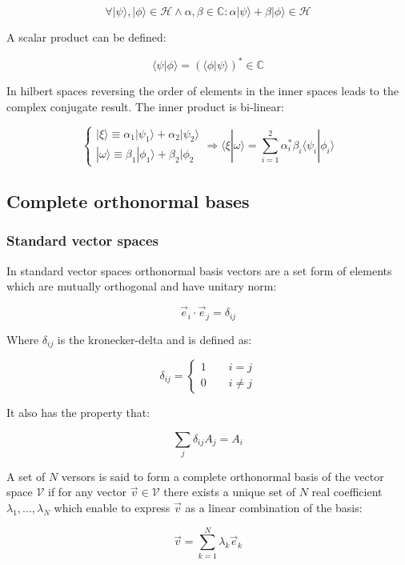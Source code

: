 		$$\forall |\psi\rangle,|\phi\rangle\in\mathcal{H}\land \alpha,\beta\in\mathbb{C}: \alpha|\psi\rangle + \beta|\phi\rangle\in\mathcal{H}$$

		A scalar product can be defined:

		$$\langle\psi|\phi\rangle = (\langle\phi|\psi\rangle)^*\in\mathbb{C}$$

		In hilbert spaces reversing the order of elements in the inner spaces leads to the complex conjugate result.
		The inner product is bi-linear:

		$$\begin{cases}|\xi\rangle \equiv \alpha_1|\psi_1\rangle + \alpha_2|\psi_2\rangle\\|\omega\rangle \equiv \beta_1|\phi_1\rangle + \beta_2|\phi_2\end{cases}\Rightarrow \langle\xi|\omega\rangle = \sum\limits_{i=1}^2\alpha_i^*\beta_i\langle \psi_i|\phi_i\rangle$$

	\subsection{Complete orthonormal bases}

		\subsubsection{Standard vector spaces}
		In standard vector spaces orthonormal basis vectors are a set form of elements which are mutually orthogonal and have unitary norm:

		$$\vec{e}_i\cdot\vec{e}_j = \delta_{ij}$$

		Where $\delta_{ij}$ is the kronecker-delta and is defined as:

		$$\delta_{ij} = \begin{cases}1\qquad i = j\\ 0\qquad i\neq j\end{cases}$$

		It also has the property that:

		$$\sum\limits_j\delta_{ij}A_j = A_i$$

		A set of $N$ versors is said to form a complete orthonormal basis of the vector space $\mathcal{V}$ if for any vector $\vec{v}\in\mathcal{V}$ there exists a unique set of $N$ real coefficient $\lambda_1, \dots, \lambda_N$ which enable to express $\vec{v}$ as a linear combination of the basis:

		$$\vec{v} = \sum\limits_{k=1}^N\lambda_k\vec{e}_k$$

